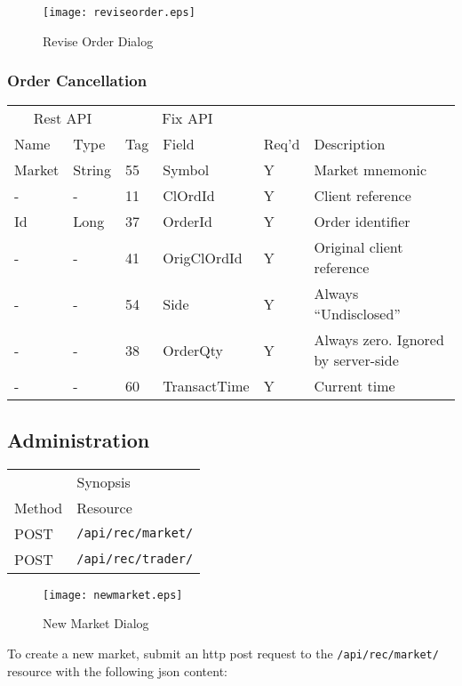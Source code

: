 \documentclass[11pt,a4paper]{article}
\begin{document}
\begin{figure}[H]
\centering
\texttt{[image: reviseorder.eps]}
\caption{Revise Order Dialog}
\end{figure}

\subsubsection{Order Cancellation}

\vspace{5mm}
\begin{tabular}{ll|ll|ll}
\multicolumn{2}{c}{Rest API}&\multicolumn{2}{c}{Fix API}\\
Name&Type&Tag&Field&Req'd&Description\\
\hline
Market&String&55&Symbol&Y&Market mnemonic\\
-&-&11&ClOrdId&Y&Client reference\\
Id&Long&37&OrderId&Y&Order identifier\\
-&-&41&OrigClOrdId&Y&Original client reference\\
-&-&54&Side&Y&Always ``Undisclosed''\\
-&-&38&OrderQty&Y&Always zero. Ignored by server-side\\
-&-&60&TransactTime&Y&Current time\\
\end{tabular}
\vspace{5mm}

\subsection{Administration}

\vspace{5mm}
\begin{tabular}{ll}
\multicolumn{2}{c}{Synopsis}\\
Method&Resource\\
\hline
POST&\texttt{/api/rec/market/}\\
POST&\texttt{/api/rec/trader/}\\
\end{tabular}
\vspace{5mm}

\begin{figure}[H]
\centering
\texttt{[image: newmarket.eps]}
\caption{New Market Dialog}
\end{figure}

To create a new \gls{market}, submit an \gls{http} post request to the \texttt{/api/rec/market/}
resource with the following \gls{json} content:
\end{document}
